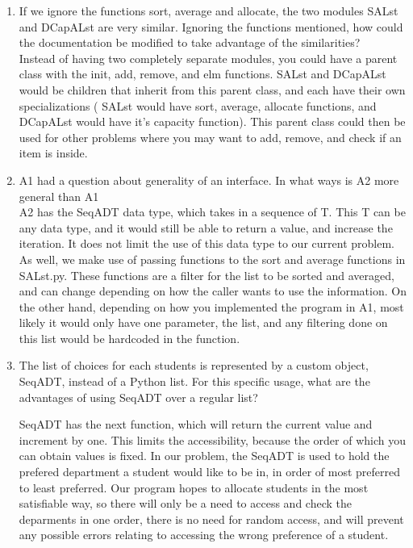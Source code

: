 \documentclass[12pt]{article}
\begin{document}
\begin{enumerate}[label=\alph*]
\item If we ignore the functions sort, average and allocate, the two modules SALst and DCapALst are very similar. Ignoring the functions mentioned, how could the documentation be modified to take advantage of the similarities?  \\ 

Instead of having two completely separate modules, you could have a parent class with the init, add, remove, and elm functions. SALst and DCapALst would be children that inherit from this parent class, and each have their own specializations ( SALst would have sort, average, allocate functions, and DCapALst would have it's capacity function). This parent class could then be used for other problems where you may want to add, remove, and check if an item is inside.

\item A1 had a question about generality of an interface. In what ways is A2 more general than A1 \\ 

A2 has the SeqADT data type, which takes in a sequence of T. This T can be any data type, and it would still be able to return a value, and increase the iteration. It does not limit the use of this data type to our current problem. As well, we make use of passing functions to the sort and average functions in SALst.py. These functions are a filter for the list to be sorted and averaged, and can change depending on how the caller wants to use the information. On the other hand, depending on how you implemented the program in A1, most likely it would only have one parameter, the list, and any filtering done on this list would be hardcoded in the function.

\item The list of choices for each students is represented by a custom object, SeqADT, instead of a Python list. For this specific usage, what are the advantages of using SeqADT over a regular list?

SeqADT has the next function, which will return the current value and increment by one. This limits the accessibility, because the order of which you can obtain values is fixed. In our problem, the SeqADT is used to hold the prefered department a student would like to be in, in order of most preferred to least preferred. Our program hopes to allocate students in the most satisfiable way, so there will only be a need to access and check the deparments in one order, there is no need for random access, and will prevent any possible errors relating to accessing the wrong preference of a student.


\end{enumerate}
\end{document}

